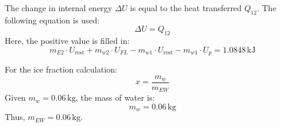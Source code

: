 The change in internal energy \( \Delta U \) is equal to the heat transferred \( Q_{12} \). The following equation is used:  
\[
\Delta U = Q_{12}
\]  
Here, the positive value is filled in:  
\[
m_{E2} \cdot U_{\text{rest}} + m_{w2} \cdot U_{FL} - m_{w1} \cdot U_{\text{rest}} - m_{w1} \cdot U_p = 1.0848 \, \text{kJ}
\]  

For the ice fraction calculation:  
\[
x = \frac{m_w}{m_{EW}}
\]  
Given \( m_w = 0.06 \, \text{kg} \), the mass of water is:  
\[
m_w = 0.06 \, \text{kg}
\]  
Thus, \( m_{EW} = 0.06 \, \text{kg} \).